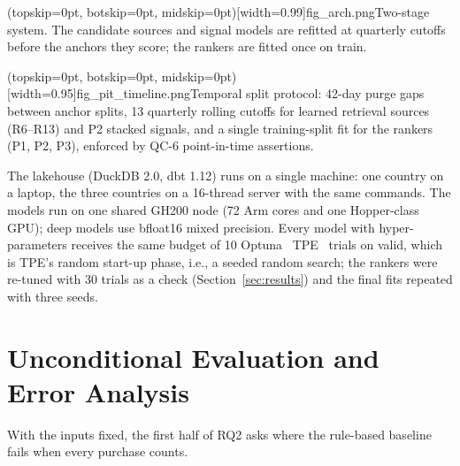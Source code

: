 \documentclass{ieeeaccess}
\begin{document}
\Figure[t!](topskip=0pt, botskip=0pt, midskip=0pt)[width=0.99\columnwidth]{fig_arch.png}{Two-stage system. The candidate sources and signal models are refitted at quarterly cutoffs before the anchors they score; the rankers are fitted once on train.\label{fig:arch}}

\Figure[t!](topskip=0pt, botskip=0pt, midskip=0pt)[width=0.95\textwidth]{fig_pit_timeline.png}{Temporal split protocol: 42-day purge gaps between anchor splits, 13 quarterly rolling cutoffs for learned retrieval sources (R6--R13) and P2 stacked signals, and a single training-split fit for the rankers (P1, P2, P3), enforced by QC-6 point-in-time assertions.\label{fig:pit_timeline}}

The lakehouse (DuckDB 2.0, dbt 1.12) runs on a single machine: one country on a laptop, the three countries on a 16-thread server
with the same commands. The models run on one shared GH200 node (72 Arm cores and one Hopper-class GPU); deep models use bfloat16
mixed precision. Every model with hyper-parameters receives
the same budget of 10 Optuna~\cite{akiba2019optuna} TPE~\cite{bergstra2011tpe} trials on valid, which is TPE's random start-up phase,
i.e., a seeded random search; the rankers were re-tuned with 30 trials as a check (Section~\ref{sec:results}) and the final fits
repeated with three seeds.

\section{Unconditional Evaluation and Error Analysis}
\label{sec:protocol}

With the inputs fixed, the first half of RQ2 asks where the rule-based baseline fails when every purchase counts.
\end{document}

